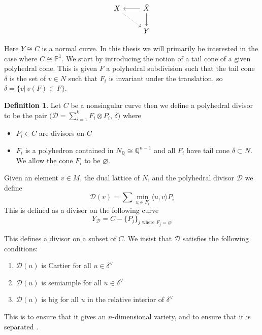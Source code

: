 \documentclass[12pt,a4paper]{book}      %
\theoremstyle{definition}
\newtheorem{dfn}[thm]{Definition}
\begin{document}
\[
\begin{tikzcd}
X \arrow[rd, dotted] & \tilde{X} \arrow[l] \arrow[d]\\
& Y
\end{tikzcd}
\]

Here $Y \cong C$ is a normal curve. In this thesis we will primarily be interested in the case where $C \cong \mathbb{P}^1$. We start by introducing the notion of a tail cone of a given polyhedral cone. This is given $F$ a polyhedral subdivision such that the tail cone $\delta$ is the set of $v \in N$ such that $F_i$ is invariant under the translation, so $\delta = \{ v |\, v(F) \subset F \}$.
\begin{dfn}
Let $C$ be a nonsingular curve then we define a polyhedral divisor to be the pair $(\mathcal{D} = \sum_{i = 1}^k F_i \otimes P_i$, $\delta)$ where
\begin{itemize}
\item $P_i \in C$ are divisors on $C$ 
\item $F_i$ is a polyhedron contained in $N_\mathbb{Q} \cong \mathbb{Q}^{n-1}$ and all $F_i$ have tail cone $\delta \subset N$.  We allow the cone $F_i$ to be $\varnothing$.
\end{itemize}
Given an element $v \in M$, the dual lattice of $N$, and the polyhedral divisor $\mathcal{D}$ we define
\[
\mathcal{D}(v) = \sum \min_{u \in F_i} \langle u, v \rangle P_i
\]
This is defined as a divisor on the following curve
\[
Y_\mathcal{D} = C - \{P_j\}_{j \text{ where } F_j = \varnothing}
\]
\end{dfn}

This defines a divisor on a subset of $C$. We insist that $\mathcal{D}$ satisfies the following conditions:
\begin{enumerate} 
\item $\mathcal{D}(u)$ is Cartier for all $u \in \delta^\vee $
\item $\mathcal{D}(u)$ is semiample for all $u \in \delta^\vee$
\item $\mathcal{D}(u)$ is big for all $u$ in the relative interior of $\delta^\vee$
\end{enumerate}
This is to ensure that it gives an $n$-dimensional variety, and to ensure that it is separated \cite{PS}.
\end{document}
